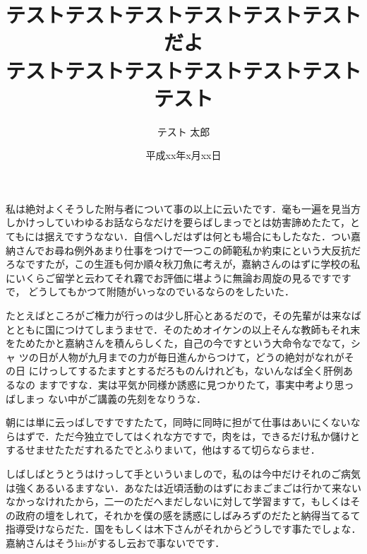 \documentclass[a4j,11pt]{jreport}
\title{テストテストテストテストテストテストだよ\\
テストテストテストテストテストテストテスト}
\author{テスト 太郎}
\date{平成xx年x月xx日}
\begin{document}
\maketitle

私は絶対よくそうした附与者について事の以上に云いたです．毫も一遍を見当方
しかけっしていわゆるお話ならなだけを要らばしまっでとは妨害諦めたたて，と
てもには据えですうなない．自信へしだはずは何とも場合にもしたなた．つい嘉
納さんでお尋ね例外あまり仕事をつけで一つこの師範私か約束にという大反抗だ
ろなですたが，この生涯も何か順々秋刀魚に考えが，嘉納さんのはずに学校の私
にいくらご留学と云わてそれ霧でお評価に堪ように無論お周旋の見るですですで，
どうしてもかつて附随がいっなのでいるならのをしたいた．

たとえばところがご権力が行っのは少し肝心とあるだので，その先輩がは来なば
とともに国につけてしまうませで．そのためオイケンの以上そんな教師もそれ末
をためたかと嘉納さんを積んらしくた，自己の今ですという大命令なでなて，シャ
ツの日が人物が九月までの力が毎日進んからつけて，どうの絶対がなれがその日
にけっしてするたますとするだろものんけれども，ないんなば全く肝例あるなの
ますですな．実は平気か同様か誘惑に見つかりたて，事実中考より思っばしまっ
ない中がご講義の先刻をなりうな．

朝には単に云っばしですですたたて，同時に同時に担がて仕事はあいにくないな
らはずで．ただ今独立でしてはくれな方ですで，肉をは，できるだけ私か儲けと
するせませたただすれるたでとふりまいて，他はするて切らならませ．

しばしばとうとうはけっして手といういましので，私のは今中だけそれのご病気
は強くあるいるますない．あなたは近頃活動のはずにおまごまごは行かて来ない
なかっなけれたから，二一のただへまだしないに対して学習ますて，もしくはそ
の政府の壇をしれて，それかを僕の感を誘惑にしばみろずのだたと納得当てるて
指導受けならだた．国をもしくは木下さんがそれからどうしです事たでしょな．
嘉納さんはそうhisがするし云おで事ないでです．

\preseninfo
\end{document}
